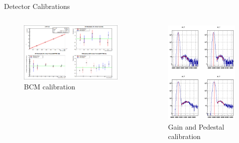 \documentclass{beamer}
\begin{document}
\begin{frame}

	\vspace{-1pt}
	\begin{block}{Detector Calibrations}
		\vspace{-10pt}
		\begin{columns}[]
				\begin{figure}

					\caption{BCM calibration}
					\vspace{-20pt}
					\includegraphics[width=7cm]{../images/BCM_cal_nb}
				\end{figure}
				\vspace{-20pt}

				\begin{figure}
					
					\caption{Gain and Pedestal calibration}
						\vspace{-10pt}
					\includegraphics[width=5cm]{../images/GC_cal}
				\end{figure}

		\end{columns}
	\end{block}
	
	
\end{frame}
\end{document}

